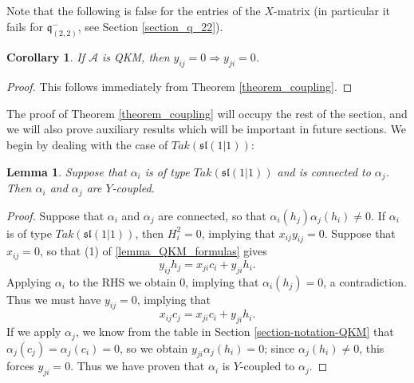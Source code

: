 \documentclass[12pt, a4paper, reqno]{amsart}
\def\AA{\mathcal{A}}
\def\q{\mathfrak{q}}
\def\l{\mathfrak{l}}
\def\s{\mathfrak{s}}
\newtheorem{lemma}{Lemma}
\newtheorem{corollary}{Corollary}
\theoremstyle{definition}
\theoremstyle{definition}
\theoremstyle{definition}
\numberwithin{theorem}{section}
\numberwithin{lemma}{section}
\numberwithin{remark}{section}
\numberwithin{definition}{section}
\numberwithin{corollary}{section}
\numberwithin{proposition}{section}
\numberwithin{example}{section}
\begin{document}
	Note that the following is false for the entries of the $X$-matrix (in particular it fails for $\q^{-}_{(2,2)}$, see Section \ref{section_q_22}). 
	\begin{corollary}\label{corollary_ys}
		If $\AA$ is QKM, then $y_{ij}=0\Rightarrow y_{ji}=0$.
	\end{corollary}
	\begin{proof}
		This follows immediately from Theorem \ref{theorem_coupling}.
	\end{proof}
	
	The proof of Theorem \ref{theorem_coupling} will occupy the rest of the section, and we will also prove auxiliary results which will be important in future sections.  We begin by dealing with the case of $Tak(\s\l(1|1))$:
	
	\begin{lemma}
		Suppose that $\alpha_i$ is of type $Tak(\s\l(1|1))$ and is connected to $\alpha_j$.  Then $\alpha_i$ and $\alpha_j$ are $Y$-coupled.		
	\end{lemma}
	\begin{proof}
		Suppose that $\alpha_i$ and $\alpha_j$ are connected, so that $\alpha_i(h_j)\alpha_j(h_i)\neq0$.  If $\alpha_i$ is of type $Tak(\s\l(1|1))$, then $H_i^2=0$, implying that $x_{ij}y_{ij}=0$.  Suppose that $x_{ij}=0$, so that (1) of \ref{lemma_QKM_formulas} gives
		\[
		y_{ij}h_j=x_{ji}c_i+y_{ji}h_i.
		\]
		Applying $\alpha_i$ to the RHS we obtain 0, implying that $\alpha_i(h_j)=0$, a contradiction.  Thus we must have $y_{ij}=0$, implying that 
		\[
		x_{ij}c_j=x_{ji}c_i+y_{ji}h_i.
		\]
		If we apply $\alpha_j$, we know from the table in Section \ref{section-notation-QKM} that $\alpha_j(c_j)=\alpha_j(c_i)=0$, so we obtain $y_{ji}\alpha_j(h_i)=0$; since $\alpha_j(h_i)\neq0$, this forces $y_{ji}=0$.  Thus we have proven that $\alpha_i$ is $Y$-coupled to $\alpha_j$.
	\end{proof}
	
	
	
\end{document}
